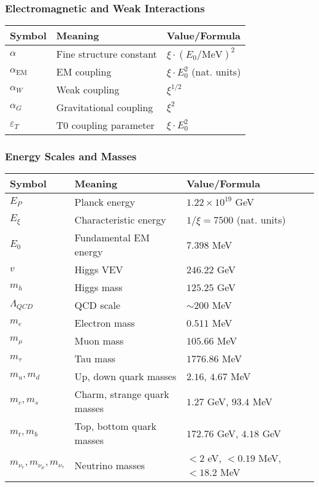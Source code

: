 \documentclass[12pt,a4paper]{article}
\begin{document}
	\subsubsection{Electromagnetic and Weak Interactions}
	\begin{longtable}{lll}
		\toprule
		\textbf{Symbol} & \textbf{Meaning} & \textbf{Value/Formula} \\
		\midrule
		$\alpha$ & Fine structure constant & $\xi \cdot (E_0/\text{MeV})^2$ \\
		$\alpha_{\text{EM}}$ & EM coupling & $\xi \cdot E_0^2$ (nat. units) \\
		$\alpha_W$ & Weak coupling & $\xi^{1/2}$ \\
		$\alpha_G$ & Gravitational coupling & $\xi^{2}$ \\
		$\varepsilon_T$ & T0 coupling parameter & $\xi \cdot E_0^2$ \\
		\bottomrule
	\end{longtable}
	
	\subsubsection{Energy Scales and Masses}
	\begin{longtable}{lll}
		\toprule
		\textbf{Symbol} & \textbf{Meaning} & \textbf{Value/Formula} \\
		\midrule
		$E_P$ & Planck energy & $1.22 \times 10^{19}$ GeV \\
		$E_\xi$ & Characteristic energy & $1/\xi = 7500$ (nat. units) \\
		$E_0$ & Fundamental EM energy & $7.398$ MeV \\
		$v$ & Higgs VEV & $246.22$ GeV \\
		$m_h$ & Higgs mass & $125.25$ GeV \\
		$\Lambda_{QCD}$ & QCD scale & $\sim 200$ MeV \\
		$m_e$ & Electron mass & $0.511$ MeV \\
		$m_\mu$ & Muon mass & $105.66$ MeV \\
		$m_\tau$ & Tau mass & $1776.86$ MeV \\
		$m_u, m_d$ & Up, down quark masses & $2.16$, $4.67$ MeV \\
		$m_c, m_s$ & Charm, strange quark masses & $1.27$ GeV, $93.4$ MeV \\
		$m_t, m_b$ & Top, bottom quark masses & $172.76$ GeV, $4.18$ GeV \\
		$m_{\nu_e}, m_{\nu_\mu}, m_{\nu_\tau}$ & Neutrino masses & $< 2$ eV, $< 0.19$ MeV, $< 18.2$ MeV \\
		\bottomrule
	\end{longtable}
	
\end{document}
